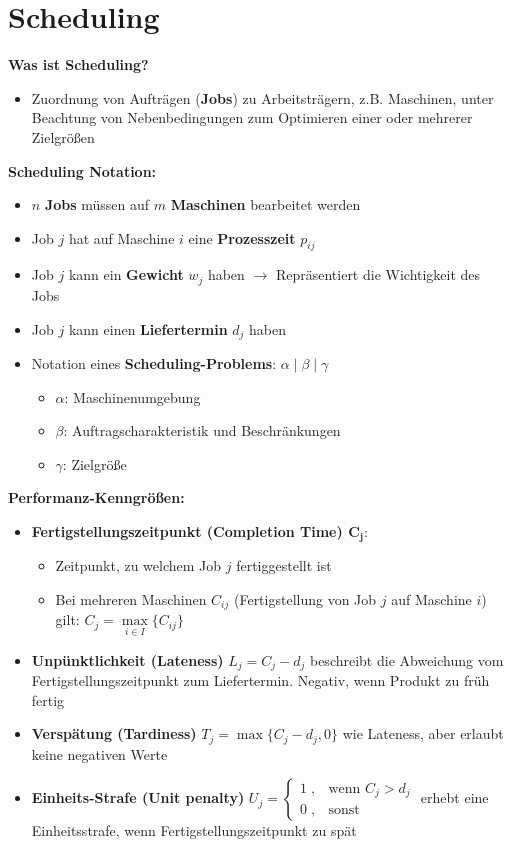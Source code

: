 \section{Scheduling}

\textbf{Was ist Scheduling?}
\begin{itemize}
	\item Zuordnung von Aufträgen (\textbf{Jobs}) zu Arbeitsträgern, z.B. Maschinen, unter Beachtung von Nebenbedingungen zum Optimieren einer oder mehrerer Zielgrößen
\end{itemize}
\bigskip
\textbf{Scheduling Notation:}
\begin{itemize}
	\item $n$ \textbf{Jobs} müssen auf $m$ \textbf{Maschinen} bearbeitet werden
	\item Job $j$ hat auf Maschine $i$ eine \textbf{Prozesszeit} $p_{ij}$
	\item Job $j$ kann ein \textbf{Gewicht} $w_j$ haben $\rightarrow$ Repräsentiert die Wichtigkeit des Jobs
	\item Job $j$ kann einen \textbf{Liefertermin} $d_j$ haben
	\item Notation eines \textbf{Scheduling-Problems}: $\alpha\mid\beta\mid\gamma$
	\begin{itemize}
		\item $\alpha$: Maschinenumgebung
		\item $\beta$: Auftragscharakteristik und Beschränkungen
		\item $\gamma$: Zielgröße
	\end{itemize}
\end{itemize}
\bigskip
\textbf{Performanz-Kenngrößen:}
\begin{itemize}
	\item \textbf{Fertigstellungszeitpunkt (Completion Time) $\boldsymbol{C_j}$}:
	\begin{itemize}
		 \item Zeitpunkt, zu welchem Job $j$ fertiggestellt ist
		 \item Bei mehreren Maschinen $C_{ij}$ (Fertigstellung von Job $j$ auf Maschine $i$) gilt: $C_j=\max\limits_{i\in I}\{C_{ij}\}$
	\end{itemize}  
	\item \textbf{Unpünktlichkeit (Lateness)} $L_j=C_j-d_j$ beschreibt die Abweichung vom Fertigstellungszeitpunkt zum Liefertermin. Negativ, wenn Produkt zu früh fertig
	\item \textbf{Verspätung (Tardiness)} $T_j=\max\{C_j-d_j,0\}$ wie Lateness, aber erlaubt keine negativen Werte
	\item \textbf{Einheits-Strafe (Unit penalty)}  
	$U_j=
	\begin{cases}
		1\;, & \text{wenn } C_j > d_j\\
		0\;, & \text{sonst}
	\end{cases}$
	\newline
	\newline
	erhebt eine Einheitsstrafe, wenn Fertigstellungszeitpunkt zu spät
\end{itemize}
